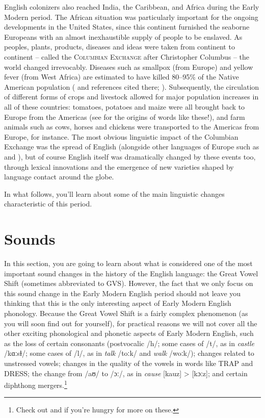 \noindent English colonizers also reached India, the Caribbean, and Africa during the Early Modern period. The African situation was particularly important for the ongoing developments in the United States, since this continent furnished the seaborne Europeans with an almost inexhaustible supply of people to be enslaved. As peoples, plants, products, diseases and ideas were taken from continent to continent -- called the \textsc{Columbian Exchange} after Christopher Columbus \citep{Crosby1972} -- the world changed irrevocably. Diseases such as smallpox (from Europe) and yellow fever (from West Africa) are estimated to have killed 80--95\% of the Native American population (\citealp[167]{Newson2001} and references cited there; \citealp[165]{NunnQian2010}). Subsequently, the circulation of different forms of crops and livestock allowed for major population increases in all of these countries: tomatoes, potatoes and maize were all brought back to Europe from the Americas (see  for the origins of words like these!), and farm animals such as cows, horses and chickens were transported to the Americas from Europe, for instance. The most obvious linguistic impact of the Columbian Exchange was the spread of English (alongside other languages of Europe such as  and ), but of course English itself was dramatically changed by these events too, through lexical innovations and the emergence of new varieties shaped by language contact around the globe.

In what follows, you'll learn about some of the main linguistic changes characteristic of this period.

\section{Sounds}
\largerpage
In this section, you are going to learn about what is considered one of the most important sound changes in the history of the English language: the Great Vowel Shift (sometimes abbreviated to GVS). However, the fact that we only focus on this sound change in the Early Modern English period should not leave you thinking that this is the only interesting aspect of Early Modern English phonology. Because the Great Vowel Shift is a fairly complex phenomenon (as you will soon find out for yourself), for practical reasons we will not cover all the other exciting phonological and phonetic aspects of Early Modern English, such as the loss of certain consonants (postvocalic /h/; some cases of /t/, as in \textit{castle} /kɑːsɫ/; some cases of /l/, as in \textit{talk} /toːk/ and \textit{walk} /woːk/); changes related to unstressed vowels; changes in the quality of the vowels in words like TRAP and DRESS; the change from /aʊ/ to /ɔː/, as in \textit{cause} [kauz] > [kɔːz]; and certain diphthong mergers.\footnote{Check out \citet[248--255]{MillHay2018} and \citet[Chapter 9]{Nevalainen2006} if you're hungry for more on these.}

